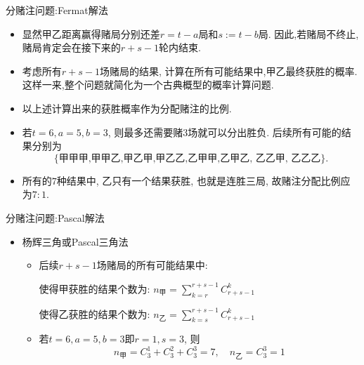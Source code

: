 \begin{frame}{分赌注问题:{\rm Fermat}解法}
\begin{itemize}[<+-|alert@+>]
	\item 显然甲乙距离赢得赌局分别还差$r=t-a$局和$s:=t-b$局. 因此,若赌局不终止,赌局肯定会在接下来的$r+s-1$轮内结束.
	\item 考虑所有$r+s-1$场赌局的结果, 计算在所有可能结果中,甲乙最终获胜的概率. 这样一来,整个问题就简化为一个古典概型的概率计算问题.%
	\item 以上述计算出来的获胜概率作为分配赌注的比例.
	\item 若$t=6,a=5,b=3$, 则最多还需要赌$3$场就可以分出胜负. 后续所有可能的结果分别为
	$$\{\text{甲甲甲,甲甲乙,甲乙甲,甲乙乙,乙甲甲,乙甲乙, 乙乙甲, 乙乙乙}\}.$$
	\item 所有的$7$种结果中, 乙只有一个结果获胜, 也就是连胜三局, 故赌注分配比例应为$7:1$.
\end{itemize}


\end{frame}

\begin{frame}{分赌注问题:{\rm Pascal}解法}
\begin{itemize}[<+-|alert@+>]
	\item 杨辉三角或Pascal三角法
	\begin{itemize}[<+-|alert@+>]
		\item 后续$r+s-1$场赌局的所有可能结果中:

		使得甲获胜的结果个数为: $n_{\text{甲}}=\sum_{k=r}^{r+s-1}C_{r+s-1}^k$

		使得乙获胜的结果个数为: $n_{\text{乙}}=\sum_{k=s}^{r+s-1}C_{r+s-1}^k$
		\item 若$t=6,a=5,b=3$即$r=1,s=3$, 则
		$$n_{\text{甲}}=C_3^1+C_3^2+C_3^3=7, \quad n_{\text{乙}}=C_3^3=1$$
	\end{itemize}


\end{itemize}

\end{frame}


